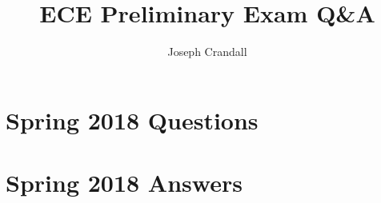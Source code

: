 
\usepackage{algorithm, algpseudocode, chemformula, color, gensymb, siunitx, soul, subfiles}
\usepackage[a4paper, total={7.5in, 10in}]{geometry}

\title{ECE Preliminary Exam Q\&A}
\author{Joseph Crandall}


\maketitle

%

\section{Spring 2018 Questions}


\section{Spring 2018 Answers}


%

%

%

%

%

%


